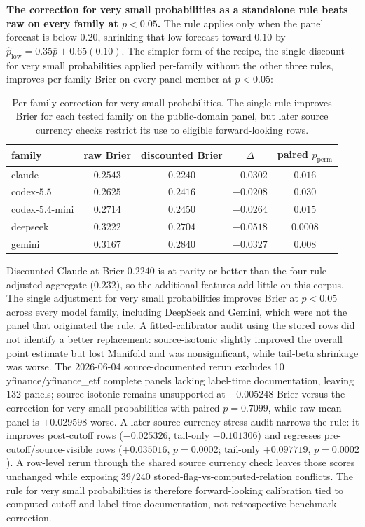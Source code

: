 \documentclass[11pt]{article}
\begin{document}
\textbf{The correction for very small probabilities as a standalone rule beats raw on every family at $p<0.05$.} The rule applies only when the panel forecast is below \(0.20\), shrinking that low forecast toward \(0.10\) by \(\hat p_{\mathrm{low}} = 0.35\bar p + 0.65(0.10)\). The simpler form of the recipe, the single discount for very small probabilities applied per-family without the other three rules, improves per-family Brier on every panel member at $p < 0.05$:

\begin{table}[htbp]
\centering
\small
\begin{tabular}{l c c c c}
\toprule
family & raw Brier & discounted Brier & $\Delta$ & paired $p_{\mathrm{perm}}$ \\
\midrule
claude        & $0.2543$ & $\mathbf{0.2240}$ & $-0.0302$ & $0.016$ \\
codex-$5.5$   & $0.2625$ & $0.2416$         & $-0.0208$ & $0.030$ \\
codex-$5.4$-mini & $0.2714$ & $0.2450$       & $-0.0264$ & $0.015$ \\
deepseek      & $0.3222$ & $\mathbf{0.2704}$ & $\mathbf{-0.0518}$ & $\mathbf{0.0008}$ \\
gemini        & $0.3167$ & $0.2840$         & $-0.0327$ & $0.008$ \\
\bottomrule
\end{tabular}
\caption{Per-family correction for very small probabilities. The single rule improves Brier for each tested family on the public-domain panel, but later source currency checks restrict its use to eligible forward-looking rows.}
\label{tab:low-prob-family}
\end{table}

Discounted Claude at Brier \(0.2240\) is at parity or better than the four-rule adjusted aggregate (\(0.232\)), so the additional features add little on this corpus. The single adjustment for very small probabilities improves Brier at \(p<0.05\) across every model family, including DeepSeek and Gemini, which were not the panel that originated the rule. A fitted-calibrator audit using the stored rows did not identify a better replacement: source-isotonic slightly improved the overall point estimate but lost Manifold and was nonsignificant, while tail-beta shrinkage was worse. The 2026-06-04 source-documented rerun excludes 10 yfinance/yfinance\_etf complete panels lacking label-time documentation, leaving 132 panels; source-isotonic remains unsupported at \(-0.005248\) Brier versus the correction for very small probabilities with paired \(p=0.7099\), while raw mean-panel is \(+0.029598\) worse. A later source currency stress audit narrows the rule: it improves post-cutoff rows (\(-0.025326\), tail-only \(-0.101306\)) and regresses pre-cutoff/source-visible rows (\(+0.035016\), \(p=0.0002\); tail-only \(+0.097719\), \(p=0.0002\)). A row-level rerun through the shared source currency check leaves those scores unchanged while exposing 39/240 stored-flag-vs-computed-relation conflicts. The rule for very small probabilities is therefore forward-looking calibration tied to computed cutoff and label-time documentation, not retrospective benchmark correction.
\end{document}
